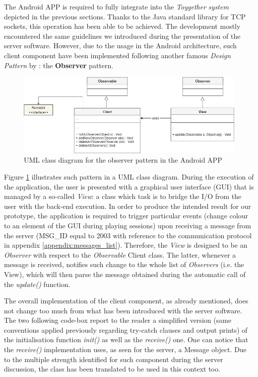 The Android APP is required to fully integrate into the \textit{Toygether system} depicted in the previous sections. Thanks to the Java standard library for TCP sockets, this operation has been able to be achieved. The development mostly encountered the same guidelines we introduced during the presentation of the server software. However, due to the usage in the Android architecture, such client component have been implemented following another famous \textit{Design Pattern} by \textcite{gamma1995design}: the \textbf{Observer} pattern.

\begin{figure}[ht]
    \centering
    \includegraphics[scale=0.5]{images/SE_UML_android_observer.png}
    \caption{UML class diagram for the observer pattern in the Android APP}
    \label{fig:SE_UML_android_observer}
\end{figure}

Figure \ref{fig:SE_UML_android_observer} illustrates such pattern in a UML class diagram. During the execution of the application, the user is presented with a graphical user interface (GUI) that is managed by a so-called \textit{View}: a class which task is to bridge the I/O from the user with the back-end execution. In order to produce the intended result for our prototype, the application is required to trigger particular events (change colour to an element of the GUI during playing sessions) upon receiving a message from the server (MSG\_ID equal to 2003 with reference to the communication protocol in appendix \ref{appendix:messages_list}). Therefore, the \textit{View} is designed to be an \textit{Observer} with respect to the \textit{Observable} Client class. The latter, whenever a message is received, notifies such change to the whole list of \textit{Observers} (i.e. the View), which will then parse the message obtained during the automatic call of the \textit{update()} function.

\medskip
The overall implementation of the client component, as already mentioned, does not change too much from what has been introduced with the server software. The two following code-box report to the reader a simplified version (same conventions applied previously regarding try-catch clauses and output prints) of the initialisation function \textit{init()} as well as the \textit{receive()} one. One can notice that the \textit{receive()} implementation uses, as seen for the server, a Message object. Due to the multiple strength identified for such component during the server discussion, the class has been translated to be used in this context too.

